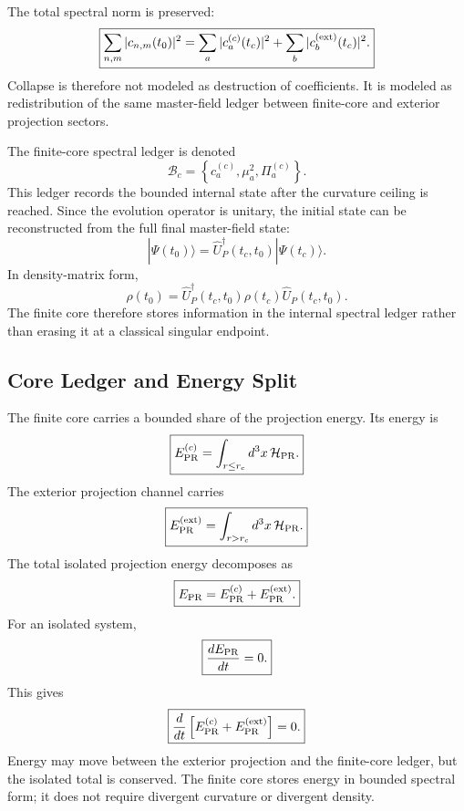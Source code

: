 \documentclass[11pt]{article}
\begin{document}
The total spectral norm is preserved:
\begin{equation}
\boxed{
\sum_{n,m}
|c_{n,m}(t_0)|^2
=
\sum_a
|c_a^{(c)}(t_c)|^2
+
\sum_b
|c_b^{({\rm ext})}(t_c)|^2.
}
\end{equation}
Collapse is therefore not modeled as destruction of coefficients. It is modeled
as redistribution of the same master-field ledger between finite-core and
exterior projection sectors.

The finite-core spectral ledger is denoted
\begin{equation}
\boxed{
\mathcal B_c
=
\left\{
c_a^{(c)},\mu_a^2,\Pi_a^{(c)}
\right\}.
}
\end{equation}
This ledger records the bounded internal state after the curvature ceiling is
reached. Since the evolution operator is unitary, the initial state can be
reconstructed from the full final master-field state:
\begin{equation}
\boxed{
|\Psi(t_0)\rangle
=
\widehat U_P^\dagger(t_c,t_0)
|\Psi(t_c)\rangle.
}
\end{equation}
In density-matrix form,
\begin{equation}
\boxed{
\rho(t_0)
=
\widehat U_P^\dagger(t_c,t_0)
\rho(t_c)
\widehat U_P(t_c,t_0).
}
\end{equation}
The finite core therefore stores information in the internal spectral ledger
rather than erasing it at a classical singular endpoint.

\subsection{Core Ledger and Energy Split}

The finite core carries a bounded share of the projection energy. Its energy is
\begin{equation}
\boxed{
E_{\rm PR}^{(c)}
=
\int_{r\leq r_c}
d^3x\,
\mathcal H_{\rm PR}.
}
\end{equation}
The exterior projection channel carries
\begin{equation}
\boxed{
E_{\rm PR}^{({\rm ext})}
=
\int_{r>r_c}
d^3x\,
\mathcal H_{\rm PR}.
}
\end{equation}
The total isolated projection energy decomposes as
\begin{equation}
\boxed{
E_{\rm PR}
=
E_{\rm PR}^{(c)}
+
E_{\rm PR}^{({\rm ext})}.
}
\end{equation}
For an isolated system,
\begin{equation}
\boxed{
\frac{dE_{\rm PR}}{dt}=0.
}
\end{equation}
This gives
\begin{equation}
\boxed{
\frac{d}{dt}
\left[
E_{\rm PR}^{(c)}
+
E_{\rm PR}^{({\rm ext})}
\right]
=
0.
}
\end{equation}
Energy may move between the exterior projection and the finite-core ledger, but
the isolated total is conserved. The finite core stores energy in bounded
spectral form; it does not require divergent curvature or divergent density.
\end{document}
